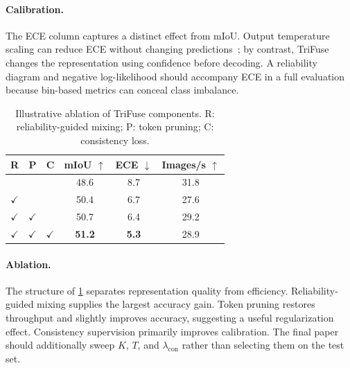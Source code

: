 \documentclass[10pt,twocolumn,letterpaper]{article}
\newcommand{\method}{TriFuse}
\begin{document}
\paragraph{Calibration.}
The ECE column captures a distinct effect from mIoU. Output temperature scaling
can reduce ECE without changing predictions~\cite{guo2017calibration}; by
contrast, \method{} changes the representation using confidence before decoding.
A reliability diagram and negative log-likelihood should accompany ECE in a
full evaluation because bin-based metrics can conceal class imbalance.

\begin{table}[t]
\centering
\caption{Illustrative ablation of \method{} components. R: reliability-guided
mixing; P: token pruning; C: consistency loss.}
\label{tab:ablation}
\small
\begin{tabular}{ccc|ccc}
\toprule
R & P & C & mIoU $\uparrow$ & ECE $\downarrow$ & Images/s $\uparrow$ \\
\midrule
  &   &   & 48.6 & 8.7 & 31.8 \\
$\checkmark$ &   &   & 50.4 & 6.7 & 27.6 \\
$\checkmark$ & $\checkmark$ &   & 50.7 & 6.4 & 29.2 \\
$\checkmark$ & $\checkmark$ & $\checkmark$ & \textbf{51.2} & \textbf{5.3} & 28.9 \\
\bottomrule
\end{tabular}
\end{table}

\paragraph{Ablation.}
The structure of \cref{tab:ablation} separates representation quality from
efficiency. Reliability-guided mixing supplies the largest accuracy gain. Token
pruning restores throughput and slightly improves accuracy, suggesting a useful
regularization effect. Consistency supervision primarily improves calibration.
The final paper should additionally sweep $K$, $T$, and
$\lambda_{\mathrm{con}}$ rather than selecting them on the test set.
\end{document}
